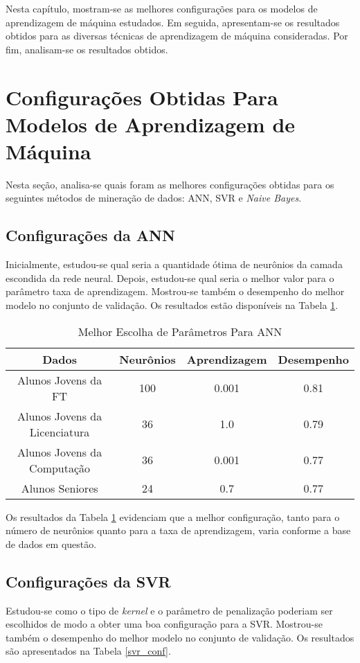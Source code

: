 Nesta capítulo, mostram-se as melhores configurações para os modelos de aprendizagem
de máquina estudados. Em seguida, apresentam-se os resultados obtidos para as
diversas técnicas de aprendizagem de máquina consideradas. Por fim, analisam-se os
resultados obtidos. 

\section{Configurações Obtidas Para Modelos de Aprendizagem de Máquina}
\label{conf_ml_models}
Nesta seção, analisa-se quais foram as melhores configurações obtidas para os
seguintes métodos de mineração de dados: ANN, SVR e \textit{Naive Bayes}. 

\subsection{Configurações da ANN} \label{ann_best_conf}
Inicialmente, estudou-se qual seria a quantidade ótima de neurônios da camada
escondida da rede neural.
Depois, estudou-se qual seria o melhor valor para o parâmetro taxa de aprendizagem. 
Mostrou-se também o desempenho do melhor modelo no conjunto de validação. 
Os resultados estão disponíveis na Tabela \ref{conf_ann}. 

\begin{table}
\caption{Melhor Escolha de Parâmetros Para ANN}
\begin{center}
\begin{tabular}[c]{| c | c | c | c |}
    \hline
    \textbf{Dados} & \textbf{Neurônios} & \textbf{Aprendizagem} 
    & \textbf{Desempenho}\\
    \hline
    Alunos Jovens da FT & 100 & 0.001 & 0.81 \\
    \hline
    Alunos Jovens da Licenciatura & 36 & 1.0 & 0.79 \\
    \hline
    Alunos Jovens da Computação & 36 & 0.001 & 0.77 \\
    \hline
    Alunos Seniores & 24  & 0.7 & 0.77 \\
    \hline
\end{tabular}
\end{center}
\label{conf_ann}
\end{table}

Os resultados da Tabela \ref{conf_ann} evidenciam que a melhor configuração, tanto
para o número de neurônios quanto para a taxa de aprendizagem, varia conforme a base
de dados em questão. 

\subsection{Configurações da SVR} \label{svr_best_conf}
Estudou-se como o tipo de \textit{kernel} e o parâmetro de penalização
poderiam ser escolhidos de modo a obter uma boa configuração para a SVR. Mostrou-se
também o desempenho do melhor modelo no conjunto de validação. Os
resultados são apresentados na Tabela \ref{svr_conf}. 

